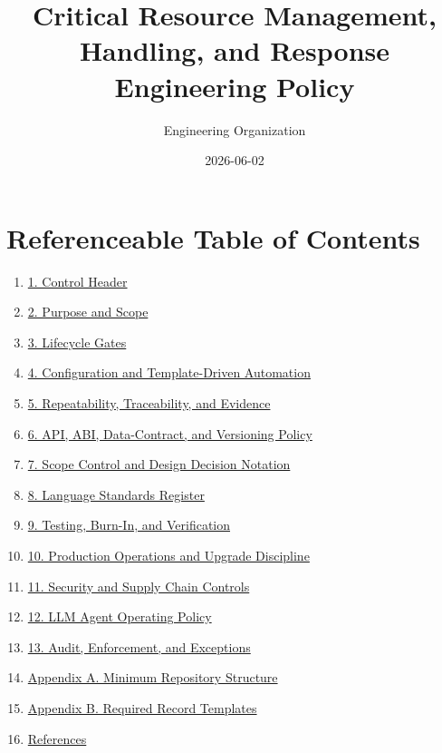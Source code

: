 \documentclass[11pt]{article}
\title{Critical Resource Management, Handling, and Response Engineering Policy}
\author{Engineering Organization}
\date{2026-06-02}
\begin{document}
\maketitle

\section*{Referenceable Table of Contents}
\begin{enumerate}
  \item \hyperlink{sec-control-header}{1. Control Header}
  \item \hyperlink{sec-purpose-scope}{2. Purpose and Scope}
  \item \hyperlink{sec-lifecycle-gates}{3. Lifecycle Gates}
  \item \hyperlink{sec-configuration-automation}{4. Configuration and Template-Driven Automation}
  \item \hyperlink{sec-repeatability-traceability}{5. Repeatability, Traceability, and Evidence}
  \item \hyperlink{sec-compatibility-versioning}{6. API, ABI, Data-Contract, and Versioning Policy}
  \item \hyperlink{sec-scope-change-control}{7. Scope Control and Design Decision Notation}
  \item \hyperlink{sec-language-standards}{8. Language Standards Register}
  \item \hyperlink{sec-testing-burn-in}{9. Testing, Burn-In, and Verification}
  \item \hyperlink{sec-production-operations}{10. Production Operations and Upgrade Discipline}
  \item \hyperlink{sec-security-supply-chain}{11. Security and Supply Chain Controls}
  \item \hyperlink{sec-llm-agent-policy}{12. LLM Agent Operating Policy}
  \item \hyperlink{sec-audit-enforcement}{13. Audit, Enforcement, and Exceptions}
  \item \hyperlink{sec-appendix-a}{Appendix A. Minimum Repository Structure}
  \item \hyperlink{sec-appendix-b}{Appendix B. Required Record Templates}
  \item \hyperlink{sec-references}{References}
\end{enumerate}

\hypertarget{sec-control-header}{}
\end{document}
